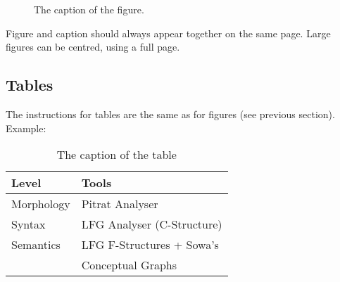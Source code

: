 \documentclass[10pt, a4paper]{article}
\begin{document}
\begin{figure}[h]
\begin{center}
\caption{The caption of the figure.}
\label{fig.1}
\end{center}
\end{figure}

Figure and caption should always appear together on the same page. Large figures can be centred, using a full page.

\subsection{Tables}

The instructions for tables are the same as for figures (see previous section).
Example:
%
\begin{table}[h]
 \begin{center}
\begin{tabular}{|l|l|}

      \hline
      Level&Tools\\
      \hline\hline
      Morphology & Pitrat Analyser\\
      Syntax & LFG Analyser (C-Structure)\\
      Semantics & LFG F-Structures + Sowa's\\
      & Conceptual Graphs\\
      \hline

\end{tabular}
\caption{The caption of the table}
 \end{center}
\end{table}

%
%
%
%
%
\end{document}
